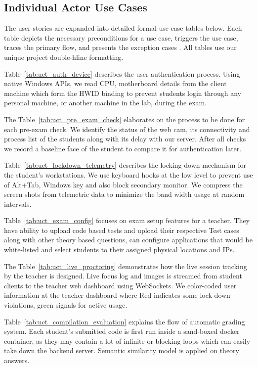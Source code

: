 \subsection{Individual Actor Use Cases}

The user stories are expanded into detailed formal use case tables below. Each table depicts the necessary preconditions for a use case, triggers the use case, traces the primary flow, and presents the exception cases \cite{use_case_definition}. All tables use our unique project double-hline formatting.

Table~\ref{tab:uct_auth_device} describes the user authentication process. Using native Windows APIs, we read CPU, motherboard details from the client machine which form the HWID binding to prevent students login through any personal machine, or another machine in the lab, during the exam.

The Table~\ref{tab:uct_pre_exam_check} elaborates on the process to be done for each pre-exam check. We identify the status of the web cam, its connectivity and process list of the students along with its delay with our server. After all checks we record a baseline face of the student to compare it for authentication later.

Table~\ref{tab:uct_lockdown_telemetry} describes the locking down mechanism for the student's workstations. We use keyboard hooks at the low level to prevent use of Alt+Tab, Windows key and also block secondary monitor. We compress the screen shots from telemetric data to minimize the band width usage at random intervals.

Table~\ref{tab:uct_exam_config} focuses on exam setup features for a teacher. They have ability to upload code based tests and upload their respective Test cases along with other theory based questions, can configure applications that would be white-listed and select students to their assigned physical locations and IPs.

The Table~\ref{tab:uct_live_proctoring} demonstrates how the live session tracking by the teacher is designed. Live focus log and images is streamed from student clients to the teacher web dashboard using WebSockets. We color-coded user information at the teacher dashboard where Red indicates some lock-down violations, green signals for active usage.

Table~\ref{tab:uct_compilation_evaluation} explains the flow of automatic grading system. Each student's submitted code is first run inside a sand-boxed docker container, as they may contain a lot of infinite or blocking loops which can easily take down the backend server. Semantic similarity model is applied on theory answers.

